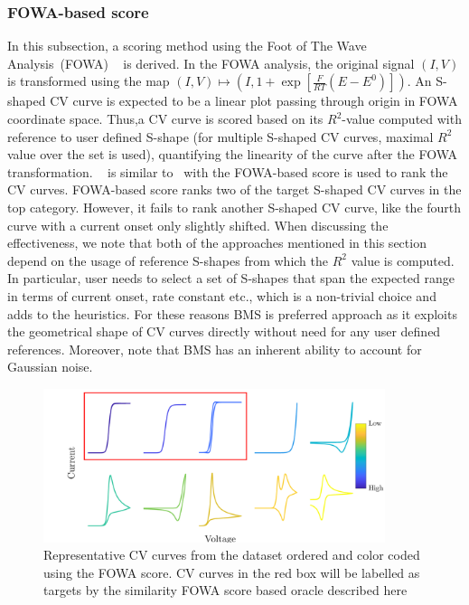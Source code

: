 \subsubsection{FOWA-based score} 
In this subsection, a scoring method using the Foot of The Wave Analysis~(FOWA) ~\cite{costentin2015cyclic} is derived.
In the FOWA analysis, the original signal \((I,V)\) is transformed using the map \((I,V)\mapsto(I,1+\exp[\frac{F}{RT}(E-E^0)])\). 
An S-shaped CV curve is expected to be a linear plot passing through origin in FOWA coordinate space. 
Thus,a CV curve is scored based on its \(R^2\)-value computed with reference to user defined S-shape (for multiple S-shaped CV curves, maximal \(R^2\) value over the set is used), quantifying the linearity of the curve after the FOWA transformation.
~ is similar to~ with the FOWA-based score is used to rank the CV curves. FOWA-based score ranks two of the target S-shaped CV curves in the top category. 
However, it fails to rank another S-shaped CV curve, like the fourth curve with a current onset only slightly shifted.
When discussing the effectiveness, we note that both of the approaches mentioned in this section depend on the usage of reference S-shapes from which the \(R^2\) value is computed. 
In particular, user needs to select a set of S-shapes that span the expected range in terms of current onset, rate constant etc., which is a non-trivial choice and adds to the heuristics. 
For these reasons BMS is preferred approach as it exploits the geometrical shape of CV curves directly without need for any user defined references. 
Moreover, note that BMS has an inherent ability to account for Gaussian noise. 
\begin{figure}[h]
    \centering
    \includegraphics[width=100mm]{Chapter-3/figures/repfowaspectrum.png}
    \caption{Representative CV curves from the dataset ordered and color coded using the FOWA score. CV curves in the red box will be labelled as targets by the similarity FOWA score based oracle described here}
    \label{figSI:repfowascores}
\end{figure}

